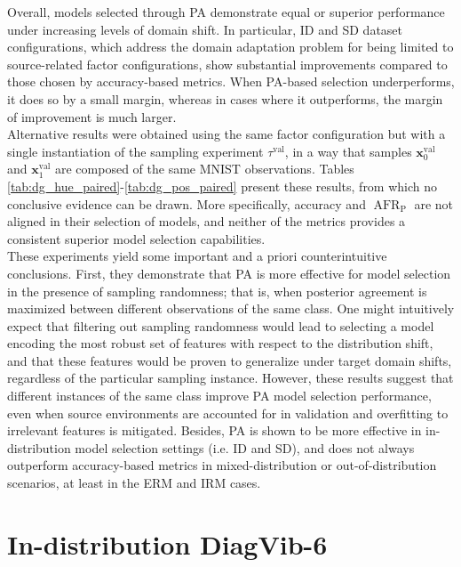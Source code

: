 Overall, models selected through PA demonstrate equal or superior performance under increasing levels of domain shift. 
In particular, ID and SD dataset configurations, which address the domain adaptation problem for being limited
to source-related factor configurations, show substantial improvements compared to those chosen by 
accuracy-based metrics. When PA-based selection underperforms, it does so by a small margin, whereas in cases where it outperforms, the 
margin of improvement is much larger. \\

Alternative results were obtained using the same factor configuration but with a single instantiation of 
the sampling experiment $\tau^{\text{val}}$, in a way that samples $\bm{x}_0^{\text{val}}$ and $\bm{x}_1^{\text{val}}$
are composed of the same MNIST observations. Tables \ref{tab:dg_hue_paired}-\ref{tab:dg_pos_paired} present these
results, from which no conclusive evidence can be drawn. More specifically, accuracy and $\operatorname{AFR}_{\text{P}}$ are
not aligned in their selection of models, and neither of the metrics provides a consistent 
superior model selection capabilities. \\

These experiments yield some important and a priori counterintuitive conclusions. First, they demonstrate 
that PA is more effective for model selection in the presence of sampling randomness; that is, when posterior 
agreement is maximized between different observations of the same class. One might intuitively expect that 
filtering out sampling randomness would lead to selecting a model encoding the most robust set of features
with respect to the distribution shift, and that these features would be proven to generalize under
target domain shifts, regardless of the particular sampling instance. However, these results suggest that 
different instances of the same class improve PA model selection performance, even when source 
environments are accounted for in validation and overfitting to irrelevant features is mitigated. Besides, 
PA is shown to be more effective in in-distribution model selection settings (i.e. ID and SD), and does not always 
outperform accuracy-based metrics in mixed-distribution or out-of-distribution scenarios, at least in the
ERM and IRM cases. \\

\newpage

\section{In-distribution DiagVib-6}

